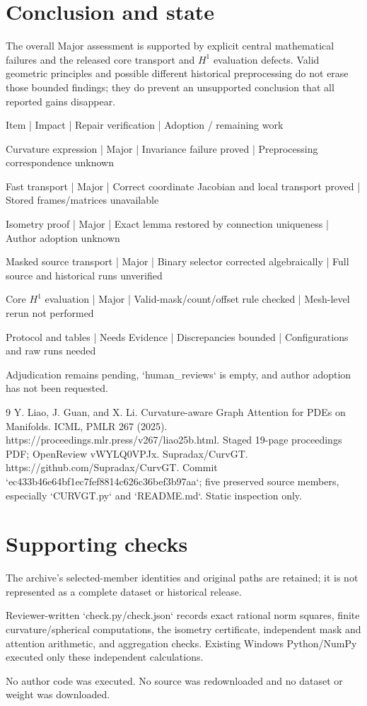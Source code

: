 \documentclass[10pt]{article}
\begin{document}
\section*{Conclusion and state}
The overall Major assessment is supported by explicit central mathematical failures and the released core transport and \(H^1\) evaluation defects. Valid geometric principles and possible different historical preprocessing do not erase those bounded findings; they do prevent an unsupported conclusion that all reported gains disappear.\par
Item | Impact | Repair verification | Adoption / remaining work\par
Curvature expression | Major | Invariance failure proved | Preprocessing correspondence unknown\par
Fast transport | Major | Correct coordinate Jacobian and local transport proved | Stored frames/matrices unavailable\par
Isometry proof | Major | Exact lemma restored by connection uniqueness | Author adoption unknown\par
Masked source transport | Major | Binary selector corrected algebraically | Full source and historical runs unverified\par
Core \(H^1\) evaluation | Major | Valid-mask/count/offset rule checked | Mesh-level rerun not performed\par
Protocol and tables | Needs Evidence | Discrepancies bounded | Configurations and raw runs needed\par
Adjudication remains pending, `human\_reviews` is empty, and author adoption has not been requested.\par
9 Y. Liao, J. Guan, and X. Li. Curvature-aware Graph Attention for PDEs on Manifolds. ICML, PMLR 267 (2025). https://proceedings.mlr.press/v267/liao25b.html. Staged 19-page proceedings PDF; OpenReview vWYLQ0VPJx. Supradax/CurvGT. https://github.com/Supradax/CurvGT. Commit `ec433b46e64bf1ec7fef8814c626c36bef3b97aa`; five preserved source members, especially `CURVGT.py` and `README.md`. Static inspection only.\par
\section*{Supporting checks}
The archive’s selected-member identities and original paths are retained; it is not represented as a complete dataset or historical release.\par
Reviewer-written `check.py/check.json` records exact rational norm squares, finite curvature/spherical computations, the isometry certificate, independent mask and attention arithmetic, and aggregation checks. Existing Windows Python/NumPy executed only these independent calculations.\par
No author code was executed. No source was redownloaded and no dataset or weight was downloaded.\par
\end{document}
